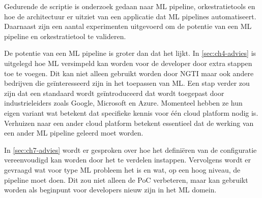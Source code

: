 Gedurende de scriptie is onderzoek gedaan naar ML pipeline, orkestratietools en hoe de architectuur er uitziet van een applicatie dat ML pipelines automatiseert. Daarnaast zijn een aantal experimenten uitgevoerd om de potentie van een ML pipeline en orkestratietool te valideren. 

De potentie van een ML pipeline is groter dan dat het lijkt. In \autoref{sec:ch4-advies} is uitgelegd hoe ML versimpeld kan worden voor de developer door extra stappen toe te voegen. Dit kan niet alleen gebruikt worden door NGTI maar ook andere bedrijven die geïnteresseerd zijn in het toepassen van ML. Een stap verder zou zijn dat een standaard wordt geïntroduceerd dat wordt toegepast door industrieleiders zoals Google, Microsoft en Azure. Momenteel hebben ze hun eigen variant wat betekent dat specifieke kennis voor één cloud platform nodig is. Verhuizen naar een ander cloud platform betekent essentieel dat de werking van een ander ML pipeline geleerd moet worden.

In \autoref{sec:ch7-advies} wordt er gesproken over hoe het definiëren van de configuratie vereenvoudigd kan worden door het te verdelen instappen. Vervolgens wordt er gevraagd wat voor type ML probleem het is en wat, op een hoog niveau, de pipeline moet doen. Dit zou niet alleen de PoC verbeteren, maar kan gebruikt worden als beginpunt voor developers nieuw zijn in het ML domein.